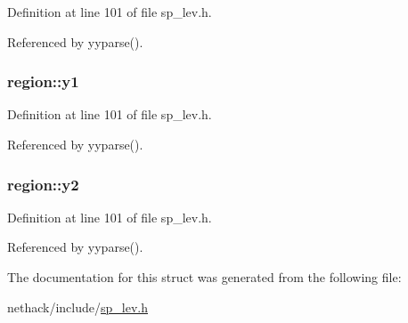Definition at line 101 of file sp\+\_\+lev.\+h.



Referenced by yyparse().

\hypertarget{structregion_a09c21dfa357e760d19824a94a79990bc}{
\subsubsection[{y1}]{ region\+::y1}}\label{structregion_a09c21dfa357e760d19824a94a79990bc}


Definition at line 101 of file sp\+\_\+lev.\+h.



Referenced by yyparse().

\hypertarget{structregion_ab6a20ba1a0cdeeec5c17276ae9a48a6f}{
\subsubsection[{y2}]{ region\+::y2}}\label{structregion_ab6a20ba1a0cdeeec5c17276ae9a48a6f}


Definition at line 101 of file sp\+\_\+lev.\+h.



Referenced by yyparse().



The documentation for this struct was generated from the following file\+:\begin{DoxyCompactItemize}
\item 
nethack/include/\hyperlink{sp__lev_8h}{sp\+\_\+lev.\+h}\end{DoxyCompactItemize}
